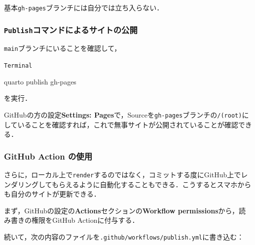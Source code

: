 \documentclass[
]{ltjsarticle}
\newenvironment{Shaded}{\begin{snugshade}}{\end{snugshade}}
\newcommand{\ExtensionTok}[1]{\textcolor[rgb]{0.00,0.23,0.31}{#1}}
\newcommand{\NormalTok}[1]{\textcolor[rgb]{0.00,0.23,0.31}{#1}}
\begin{document}
基本\texttt{gh-pages}ブランチには自分では立ち入らない．

\subsubsection{\texorpdfstring{\texttt{Publish}コマンドによるサイトの公開}{Publishコマンドによるサイトの公開}}\label{publishux30b3ux30deux30f3ux30c9ux306bux3088ux308bux30b5ux30a4ux30c8ux306eux516cux958b}

\texttt{main}ブランチにいることを確認して，

\begin{codelisting}

\caption{\texttt{Terminal}}

\begin{Shaded}
\begin{Highlighting}[]
\ExtensionTok{quarto}\NormalTok{ publish gh{-}pages}
\end{Highlighting}
\end{Shaded}

\end{codelisting}

を実行．

GitHubの方の設定\textbf{Settings:
Pages}で，Sourceを\texttt{gh-pages}ブランチの\texttt{/(root)}にしていることを確認すれば，これで無事サイトが公開されていることが確認できる．

\subsubsection{GitHub Action
の使用}\label{github-action-ux306eux4f7fux7528}

さらに，ローカル上で\texttt{render}するのではなく，コミットする度にGitHub上でレンダリングしてもらえるように自動化することもできる．こうするとスマホからも自分のサイトが更新できる．

まず，GitHubの設定の\textbf{Actions}セクションの\textbf{Workflow
permissions}から，読み書きの権限をGitHub Actionに付与する．

続いて，次の内容のファイルを\texttt{.github/workflows/publish.yml}に書き込む：
\end{document}
